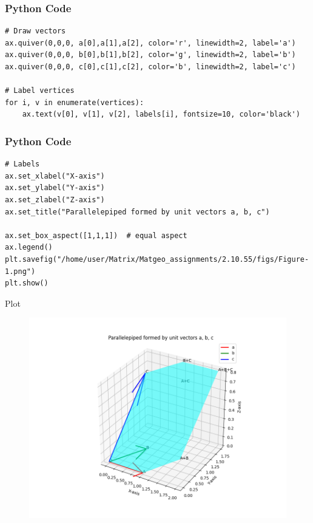 \documentclass{beamer}
\begin{document}
\begin{frame}[fragile]
    \frametitle{Python Code}
    \begin{lstlisting}
# Draw vectors
ax.quiver(0,0,0, a[0],a[1],a[2], color='r', linewidth=2, label='a')
ax.quiver(0,0,0, b[0],b[1],b[2], color='g', linewidth=2, label='b')
ax.quiver(0,0,0, c[0],c[1],c[2], color='b', linewidth=2, label='c')

# Label vertices
for i, v in enumerate(vertices):
    ax.text(v[0], v[1], v[2], labels[i], fontsize=10, color='black')
    \end{lstlisting}
\end{frame}

\begin{frame}[fragile]
    \frametitle{Python Code}
    \begin{lstlisting}
# Labels
ax.set_xlabel("X-axis")
ax.set_ylabel("Y-axis")
ax.set_zlabel("Z-axis")
ax.set_title("Parallelepiped formed by unit vectors a, b, c")

ax.set_box_aspect([1,1,1])  # equal aspect
ax.legend()
plt.savefig("/home/user/Matrix/Matgeo_assignments/2.10.55/figs/Figure-1.png")
plt.show()

    \end{lstlisting}
\end{frame}

\begin{frame}{Plot}
    \begin{figure}[H]
    \centering
    \includegraphics[width=0.8\columnwidth]{figs/Figure-1.png}
    \label{fig:1}
\end{figure}
\end{frame}
\end{document}
